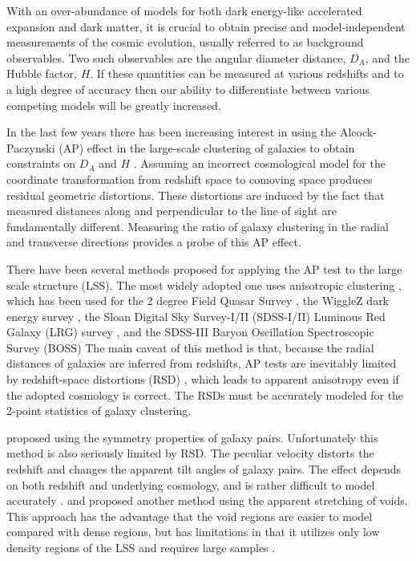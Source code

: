 \documentclass[iop]{emulateapj}
\begin{document}
With an over-abundance of models for both dark energy-like accelerated expansion and dark matter, 
it is crucial to obtain precise and model-independent measurements of the cosmic evolution, usually referred to as background observables. 
Two such observables are the angular diameter distance, $D_A$, and the Hubble factor, $H$.  
If these quantities can be measured at various redshifts and to a high degree of accuracy then our ability to differentiate between various competing models will be greatly increased.

In the last few years there has been increasing interest in using the Alcock-Paczynski (AP) effect \citep{AP1979} 
in the large-scale clustering of galaxies to obtain constraints on $D_A$ and $H$ \citep{Guzzo2008,topology}. 
Assuming an incorrect cosmological model for the coordinate transformation from redshift space to comoving space produces residual geometric distortions. 
These distortions are induced by the fact that measured distances along and perpendicular to the line of sight are fundamentally different. 
Measuring the ratio of galaxy clustering in the radial and transverse directions provides a probe of this AP effect.

There have been several methods proposed for applying the AP test to the large scale structure (LSS).
The most widely adopted one uses anisotropic clustering \citep{Ballinger1996,Matsubara1996},
which has been used for the 2 degree Field Quasar Survey \citep{Outram2004},
the WiggleZ dark energy survey \citep{Blake2011}, 
the Sloan Digital Sky Survey-I/II (SDSS-I/II) Luminous Red Galaxy (LRG) survey \citep{Eisenstein et al. 2011,ChuangWang2012},
and the SDSS-III Baryon Oscillation Spectroscopic Survey (BOSS) 
\citep{Reid2012,Beutler2013,Linder2013,2014arXiv1407.2257S, 2014ApJ...781...96L,
Alam2016, Beutler2016, Sanchez2016}
The main caveat of this method is that,
because the radial distances of galaxies are inferred from redshifts,
AP tests are inevitably limited by redshift-space distortions (RSD) \citep{Ballinger1996},
which leads to apparent anisotropy even if the adopted cosmology is correct.
The RSDs must be accurately modeled for the 2-point statistics of galaxy clustering.


\cite{Marinoni2010} proposed using the symmetry properties of galaxy pairs.
Unfortunately this method is also seriously limited by RSD.
The peculiar velocity distorts the redshift and changes the apparent tilt angles of galaxy pairs.
The effect depends on both redshift and underlying cosmology, and is rather difficult to model accurately \citep{Jennings2011}.
\cite{Ryden1995} and \cite{LavausWandelt1995} proposed another method using the apparent stretching of voids.
This approach has the advantage that the void regions are easier to model compared with dense regions,
but has limitations in that it utilizes only low density regions of the LSS
and requires large samples \citep{Qingqing2016}.
\end{document}
